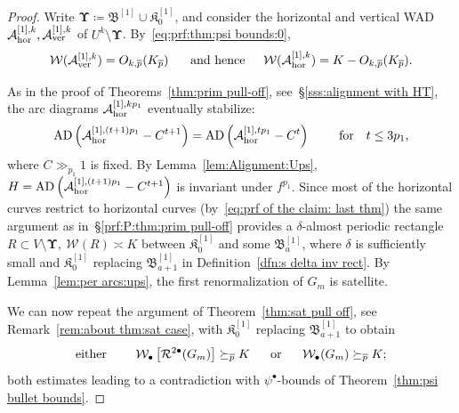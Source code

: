 \documentclass{amsart}
\newcommand{\filled}{{\mathfrak K }}
\newcommand{\AD}{{\operatorname{AD}}}
\newcommand{\bush}{{\mathfrak B }}
\newcommand{\bbush}{{\boldsymbol {\mathfrak B} }}
\newcommand{\bUpsilon}{{\boldsymbol {\Upsilon} }}
\renewcommand{\sp}{{\ \ }}
\newcommand{\1}{{\mathbb 1 }}
\newcommand{\Width}{{\mathcal W}}
\renewcommand{\AA}{{\mathcal A}}
\begin{document}
\begin{proof}
Write $\bUpsilon\coloneqq \bbush^{[1]}\cup \filled^{[1]}_0$, and consider the horizontal and vertical WAD $\AA^{[1],k}_\hor, \AA^{[1],k}_\ver$ of $U^k\setminus \bUpsilon$. By~\eqref{eq:prf:thm:psi bounds:0}, 
\begin{equation}
\label{eq:prf of the claim: last thm}
\Width(\AA^{[1],k}_\ver)= O_{k,\overline p}(K_{\overline p}) \hspace{0.5cm}\text{ and hence }\hspace{0.4cm}\Width(\AA^{[1],k}_\hor)=K - O_{k,\overline p}(K_{\overline p}).
\end{equation}


As in the proof of Theorems~\ref{thm:prim pull-off}, see~\S\ref{sss:alignment with HT}, the arc diagrams $\AA^{[1],k p_1}_\hor$ eventually stabilize:
\[ \AD \left( \AA^{[1],(t+1) p_1}_\hor -C^{t+1}  \right)= \AD \left(  \AA^{[1],t p_1}_\hor -C^{t} \right) \sp\sp\sp\text{ for }\sp  t\le 3p_1, \]
where $C\gg_{p_1} 1$ is fixed. By  Lemma~\ref{lem:Alignment:Ups}, $H=\AD \left( \AA^{[1],(t+1) p_1}_\hor -C^{t+1}  \right)$ is invariant under $f^{p_1}$. Since most of the horizontal curves restrict to horizontal curves (by~\eqref{eq:prf of the claim: last thm}) the same argument as in~\S\ref{prf:P:thm:prim pull-off} provides a $\delta$-almost periodic rectangle $R\subset {V\setminus \bUpsilon},\  \Width(R)\asymp K$ between $\filled^{[1]}_0$ and some $\bush^{[1]}_a$, where $\delta$ is sufficiently small and $\filled^{[1]}_0$ replacing $\bush^{[1]}_{a+1}$ in Definition~\ref{dfn:s delta inv rect}. By Lemma~\ref{lem:per arcs:ups}, the first renormalization of $G_m$ is satellite.

We can now repeat the argument of Theorem~\ref{thm:sat pull off}, see Remark~\ref{rem:about thm:sat case}, with $\filled^{[1]}_0$ replacing $\bush^{[1]}_{a+1}$ to obtain 
\[\text{either }\sp \sp\sp\Width_\bullet\left[ \RR^{2 \bullet} (G_m)\right]\succeq_{\overline p} K \sp\sp\text{ or }\sp\sp  \Width_\bullet( G_m)\succeq_{\overline p}  K;\]
both estimates leading to a contradiction with $\psi^\bullet$-bounds of Theorem~\ref{thm:psi bullet bounds}.
\end{proof}
\end{document}
